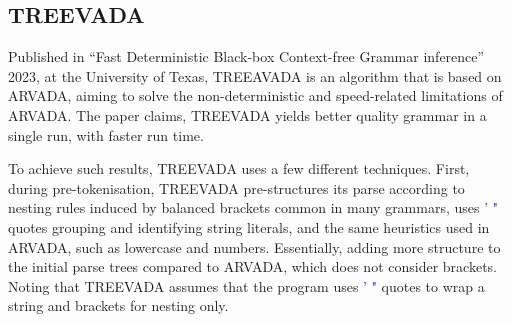 \subsection{TREEVADA}

Published in \enquote{Fast Deterministic Black-box Context-free Grammar inference} 2023, at the University of Texas\cite{arefinFastDeterministicBlackbox2024}, TREEAVADA is an algorithm that is based on ARVADA\cite{kulkarniLearningHighlyRecursive2021}, aiming to solve the non-deterministic and speed-related limitations of ARVADA. The paper claims, TREEVADA yields better quality grammar in a single run, with faster run time.

\vspace{\baselineskip}
To achieve such results, TREEVADA uses a few different techniques. First, during pre-tokenisation, TREEVADA pre-structures its parse according to nesting rules induced by balanced brackets common in many grammars, uses \textcolor{blue}{' "} quotes grouping and identifying string literals, and the same heuristics used in ARVADA, such as lowercase and numbers. Essentially, adding more structure to the initial parse trees compared to ARVADA, which does not consider brackets. Noting that TREEVADA assumes that the program uses \textcolor{blue}{' "} quotes to wrap a string and brackets for nesting only.

